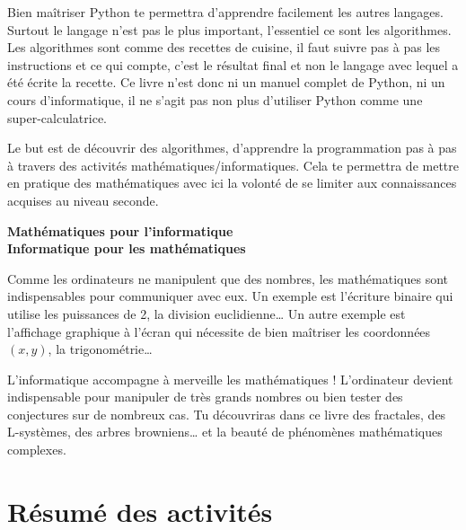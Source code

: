 Bien maîtriser Python te permettra d'apprendre facilement les autres langages. Surtout le langage n'est pas le plus important, l'essentiel ce sont les algorithmes. Les algorithmes sont comme des recettes de cuisine, il faut suivre pas à pas les instructions et ce qui compte, c'est le résultat final et non le langage avec lequel a été écrite la recette. Ce livre n'est donc ni un manuel complet de Python, ni un cours d'informatique, il ne s'agit pas non plus d'utiliser Python comme une super-calculatrice.

Le but est de découvrir des algorithmes, d'apprendre la programmation pas à pas à travers des activités mathématiques/informatiques. Cela te permettra de mettre en pratique des mathématiques avec ici la volonté de se limiter aux connaissances acquises au niveau seconde.

\bigskip

{\large\textbf{Mathématiques pour l'informatique}}\\
{\large\textbf{Informatique pour les mathématiques}}

Comme les ordinateurs ne manipulent que des nombres, les mathématiques sont indispensables pour communiquer avec eux. Un exemple est l'écriture binaire qui utilise les puissances de 2, la division euclidienne\ldots{} Un autre exemple est l'affichage graphique à l'écran qui nécessite de bien maîtriser les  coordonnées $(x,y)$, la trigonométrie\ldots

L'informatique accompagne à merveille les mathématiques ! L'ordinateur devient indispensable pour manipuler de très grands nombres ou bien tester des conjectures sur de nombreux cas. Tu découvriras dans ce livre des fractales, des L-systèmes, des arbres browniens\ldots{} et la beauté de phénomènes mathématiques complexes.

\vspace*{\fill}



\cleardoublepage
\thispagestyle{empty}
\tableofcontents


\newpage

\section*{Résumé des activités}


\newcommand{\titreactivite}[1]{{\large\textbf{#1}}\nopagebreak}
\newcommand{\descriptionactivite}[1]{%
\smallskip\hfill
\begin{minipage}{0.95\textwidth}#1\end{minipage}\medskip\smallskip}

